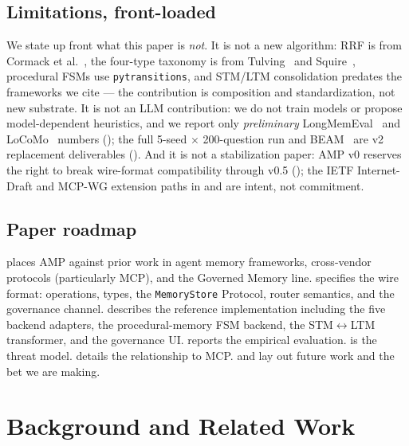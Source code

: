 \documentclass[11pt,letterpaper,twocolumn]{article}
\begin{document}
\subsection{Limitations, front-loaded}
\label{sec:intro-limitations}

We state up front what this paper is \emph{not}. It is not a new algorithm: RRF is from Cormack et al.~\cite{cormack2009rrf}, the four-type taxonomy is from Tulving~\cite{tulving1972episodic} and Squire~\cite{squire1992declarative}, procedural FSMs use \texttt{pytransitions}, and STM/LTM consolidation predates the frameworks we cite --- the contribution is composition and standardization, not new substrate. It is not an LLM contribution: we do not train models or propose model-dependent heuristics, and we report only \emph{preliminary} LongMemEval~\cite{wu2024longmemeval} and LoCoMo~\cite{maharana2024locomo} numbers (); the full 5-seed $\times$ 200-question run and BEAM~\cite{beam_benchmark} are v2 replacement deliverables (). And it is not a stabilization paper: AMP v0 reserves the right to break wire-format compatibility through v0.5 (); the IETF Internet-Draft and MCP-WG extension paths in  and  are intent, not commitment.

\subsection{Paper roadmap}
\label{sec:intro-roadmap}

 places AMP against prior work in agent memory frameworks, cross-vendor protocols (particularly MCP), and the Governed Memory line.  specifies the wire format: operations, types, the \texttt{MemoryStore} Protocol, router semantics, and the governance channel.  describes the reference implementation including the five backend adapters, the procedural-memory FSM backend, the STM$\leftrightarrow$LTM transformer, and the governance UI.  reports the empirical evaluation.  is the threat model.  details the relationship to MCP.  and  lay out future work and the bet we are making.

\section{Background and Related Work}
\label{sec:related}
\end{document}
